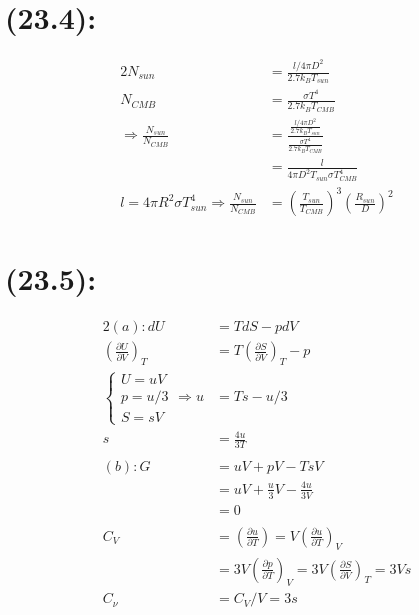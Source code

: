 \begin{latin}
    \section*{(23.4): }
    \begin{alignat*}{2}
        N_{sun} &= \frac{l/4\pi D^2}{2.7 k_B T_{sun}}\\
        N_{CMB} &= \frac{\sigma T^4}{2.7k_B T_{CMB}}\\
        \Longrightarrow \frac{N_{sun}}{N_{CMB}} &= \frac{\frac{l/4\pi D^2}{2.7 k_B T_{sun}}}{\frac{\sigma T^4}{2.7k_B T_{CMB}}} \\
        &= \frac{l}{4\pi D^2 T_{sun} \sigma T_{CMB}^4}\\
        l = 4\pi R^2 \sigma T_{sun}^4 \Rightarrow \frac{N_{sun}}{N_{CMB}} &= (\frac{T_{sun}}{T_{CMB}})^3 (\frac{R_{sun}}{D})^2
    \end{alignat*}

    \section*{(23.5):}
    \begin{alignat*}{2}
        (a):
        dU &= TdS - pdV\\
        (\frac{\partial U}{\partial V})_T &=  T(\frac{\partial S}{\partial V})_T - p\\
        \begin{cases}
            U = uV\\
            p = u/3\\
            S = sV
        \end{cases}
        \Rightarrow u &= Ts - u/3\\
        s &= \frac{4u}{3T}\\\\
        (b):
        G &= uV + pV - TsV\\
        &= uV + \frac{u}{3}V - \frac{4u}{3V}\\
        &=0\\\\
        C_V &= (\frac{\partial u}{\partial T}) = V(\frac{\partial u}{\partial T})_V\\
        &= 3V(\frac{\partial p}{\partial T})_V = 3V(\frac{\partial S}{\partial V})_T = 3Vs\\
        C_{\nu} &= C_V/ V = 3s
    \end{alignat*}


\end{latin}
